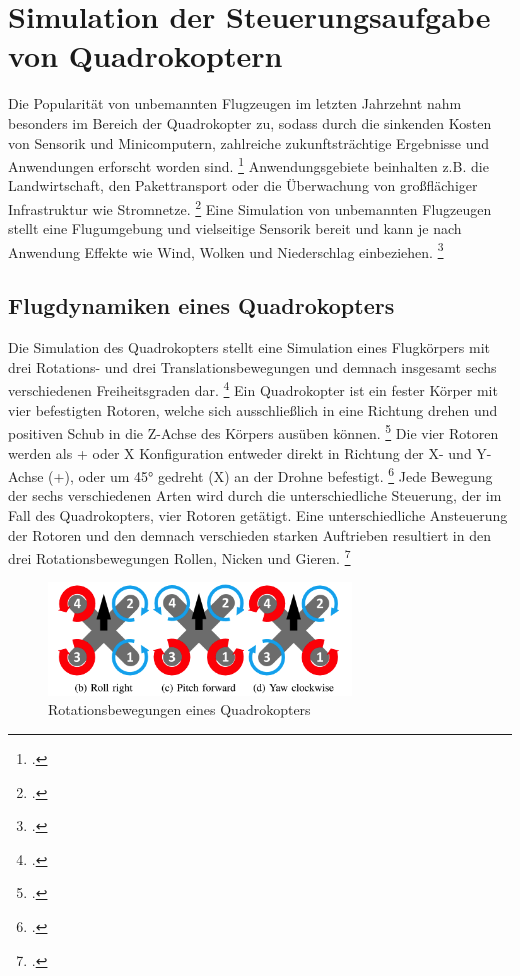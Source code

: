 \section{Simulation der Steuerungsaufgabe von Quadrokoptern}
Die Popularität von unbemannten Flugzeugen im letzten Jahrzehnt nahm besonders im Bereich der Quadrokopter zu, sodass durch die sinkenden Kosten von Sensorik und Minicomputern, zahlreiche zukunftsträchtige Ergebnisse und Anwendungen erforscht worden sind. \footcite[Vgl.][S. 1]{Koch.2018}
Anwendungsgebiete beinhalten z.B. die Landwirtschaft, den Pakettransport oder die Überwachung von großflächiger Infrastruktur wie Stromnetze. \footcite[Vgl.][S. 1]{Deshpande.2020}
Eine Simulation von unbemannten Flugzeugen stellt eine Flugumgebung und vielseitige Sensorik bereit und kann je nach Anwendung Effekte wie Wind, Wolken und Niederschlag einbeziehen. \footcite[Vgl.][S. 1496]{Hentati.2018}

\subsection{Flugdynamiken eines Quadrokopters}
Die Simulation des Quadrokopters stellt eine Simulation eines Flugkörpers mit drei Rotations- und drei Translationsbewegungen und demnach insgesamt sechs verschiedenen Freiheitsgraden dar. \footcite[Vgl.][S. 2]{Koch.2018}
Ein Quadrokopter ist ein fester Körper mit vier befestigten Rotoren, welche sich ausschließlich in eine Richtung drehen und positiven Schub in die Z-Achse des Körpers ausüben können. \footcite[Vgl.][S. 3]{Molchanov.2019}
Die vier Rotoren werden als + oder X Konfiguration entweder direkt in Richtung der X- und Y-Achse (+), oder um 45° gedreht (X) an der Drohne befestigt. \footcite[Vgl.][S. 2]{Koch.2018}
Jede Bewegung der sechs verschiedenen Arten wird durch die unterschiedliche Steuerung, der im Fall des Quadrokopters, vier Rotoren getätigt.
Eine unterschiedliche Ansteuerung der Rotoren und den demnach verschieden starken Auftrieben resultiert in den drei Rotationsbewegungen Rollen, Nicken und Gieren. \footcite[Vgl.][S. 2]{Koch.2018}
\begin{figure}[htb]
    \centering
    \includegraphics[height=3cm]{lib/graphics/Drone axis.png}
    \caption[Rotationsbewegungen eines Quadrokopters]{Rotationsbewegungen eines Quadrokopters\footnotemark}
    \label{abb:drone axis}
\end{figure}

